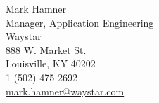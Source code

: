 Mark Hamner
  \\Manager, Application Engineering 
  \\ Waystar 
  \\ 888 W. Market St.
  \\ Louisville, KY 40202
  \\ 1 (502) 475 2692 
  \\ \href{mailto:mark.hamner@waystar.com}{mark.hamner@waystar.com}
